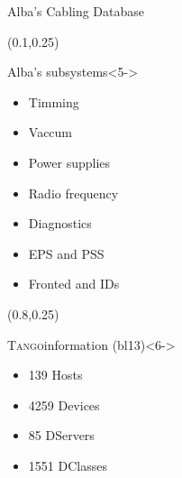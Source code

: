 \documentclass{beamer}
\newcommand{\tango}{\textsc{Tango}}
\begin{document}
\begin{frame}
\begin{textblock*}{100mm}
\begin{block}{Alba's Cabling Database}
        \end{block}
    \end{textblock*}
    \begin{textblock*}{35mm}(0.1\textwidth,0.25\textheight)
        \begin{block}{Alba's subsystems}<5->
            \begin{itemize}
                \item Timming %
                \item Vaccum %
                \item Power supplies %
                \item Radio frequency %
                \item Diagnostics %
                \item EPS and PSS
                \item Fronted and IDs
            \end{itemize}
        \end{block}
    \end{textblock*}
    \begin{textblock*}{35mm}(0.8\textwidth,0.25\textheight)
        \begin{exampleblock}{\tango information (bl13)}<6->
            \begin{itemize}
                \item 139 Hosts
                \item 4259 Devices
                \item 85 DServers
                \item 1551 DClasses
            \end{itemize}
        \end{exampleblock}
    \end{textblock*}
\end{frame}
\end{document}
